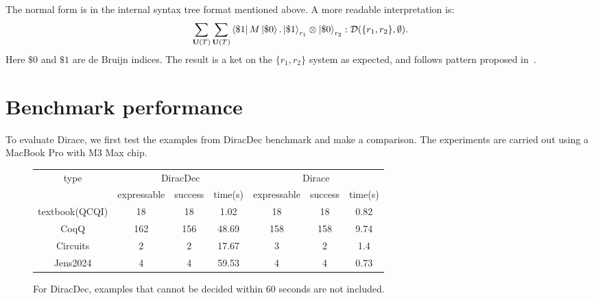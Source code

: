 \documentclass[runningheads]{llncs}
\begin{document}
The normal form is in the internal syntax tree format mentioned above. A more readable interpretation is:
\[
\sum_{\mathbf{U}(T)} \sum_{\mathbf{U}(T)} \bra{\$1}M\ket{\$ 0} . \ket{\$1}_{r_1} \otimes \ket{\$0}_{r_2} : \mathcal{D}(\{r_1, r_2\}, \emptyset).
\]
Here $\$0$ and $\$1$ are de Bruijn indices. The result is a ket on the $\{r_1, r_2\}$ system as expected, and follows pattern proposed in~.




\section{Benchmark performance}

To evaluate Dirace, we first test the examples from DiracDec benchmark and make a comparison.
The experiments are carried out using a MacBook Pro with M3 Max chip.

\begin{figure}
    \center
    \begin{tabular}{c|c c c|c c c}
        \hline
        \multirow{2}{*}{type} & \multicolumn{3}{c|}{DiracDec} & \multicolumn{3}{c}{Dirace} \\
        \cline{2-7}
                                 & expressable & success & time(s)           & expressable & success & time(s)                 \\
        \hline
        textbook(QCQI)          & 18          & 18        &    1.02        &    18      & 18          &   0.82      \\
        CoqQ                    & 162          & 156       &    48.69       &   158     &  158   &     9.74     \\
        Circuits                 & 2          & 2       &    17.67       &   3     &  2   &     1.4     \\
        Jens2024                & 4          & 4         &  59.53       &   4    & 4       &  0.73     \\
        \hline
    \end{tabular}        
    \caption{For DiracDec, examples that cannot be decided within 60 seconds are not included.}
\end{figure}
\end{document}
